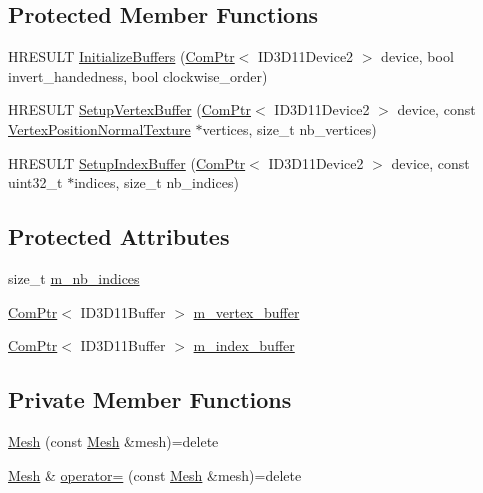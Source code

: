 \subsection*{Protected Member Functions}
\begin{DoxyCompactItemize}
\item 
H\+R\+E\+S\+U\+LT \hyperlink{classmage_1_1_mesh_af7f1ad857f340015630655ab9d34747c}{Initialize\+Buffers} (\hyperlink{namespacemage_ae74f374780900893caa5555d1031fd79}{Com\+Ptr}$<$ I\+D3\+D11\+Device2 $>$ device, bool invert\+\_\+handedness, bool clockwise\+\_\+order)
\item 
H\+R\+E\+S\+U\+LT \hyperlink{classmage_1_1_mesh_a227af05ff8cbb1ad676c93dc8dc5d14b}{Setup\+Vertex\+Buffer} (\hyperlink{namespacemage_ae74f374780900893caa5555d1031fd79}{Com\+Ptr}$<$ I\+D3\+D11\+Device2 $>$ device, const \hyperlink{structmage_1_1_vertex_position_normal_texture}{Vertex\+Position\+Normal\+Texture} $\ast$vertices, size\+\_\+t nb\+\_\+vertices)
\item 
H\+R\+E\+S\+U\+LT \hyperlink{classmage_1_1_mesh_a61d3baa68f8cc60f3d260e6ecefc126a}{Setup\+Index\+Buffer} (\hyperlink{namespacemage_ae74f374780900893caa5555d1031fd79}{Com\+Ptr}$<$ I\+D3\+D11\+Device2 $>$ device, const uint32\+\_\+t $\ast$indices, size\+\_\+t nb\+\_\+indices)
\end{DoxyCompactItemize}
\subsection*{Protected Attributes}
\begin{DoxyCompactItemize}
\item 
size\+\_\+t \hyperlink{classmage_1_1_mesh_a5e3baa9e2b2e9b4ce795a456f76d87b2}{m\+\_\+nb\+\_\+indices}
\item 
\hyperlink{namespacemage_ae74f374780900893caa5555d1031fd79}{Com\+Ptr}$<$ I\+D3\+D11\+Buffer $>$ \hyperlink{classmage_1_1_mesh_af5ae74887eb330201829477cf772ba6e}{m\+\_\+vertex\+\_\+buffer}
\item 
\hyperlink{namespacemage_ae74f374780900893caa5555d1031fd79}{Com\+Ptr}$<$ I\+D3\+D11\+Buffer $>$ \hyperlink{classmage_1_1_mesh_abe29363ebac77b284ca69532fd5b3373}{m\+\_\+index\+\_\+buffer}
\end{DoxyCompactItemize}
\subsection*{Private Member Functions}
\begin{DoxyCompactItemize}
\item 
\hyperlink{classmage_1_1_mesh_a1627e85c72d10bdedbfbf746b108cc73}{Mesh} (const \hyperlink{classmage_1_1_mesh}{Mesh} \&mesh)=delete
\item 
\hyperlink{classmage_1_1_mesh}{Mesh} \& \hyperlink{classmage_1_1_mesh_a5baf961af32b379671a59a082492bc5e}{operator=} (const \hyperlink{classmage_1_1_mesh}{Mesh} \&mesh)=delete
\end{DoxyCompactItemize}


